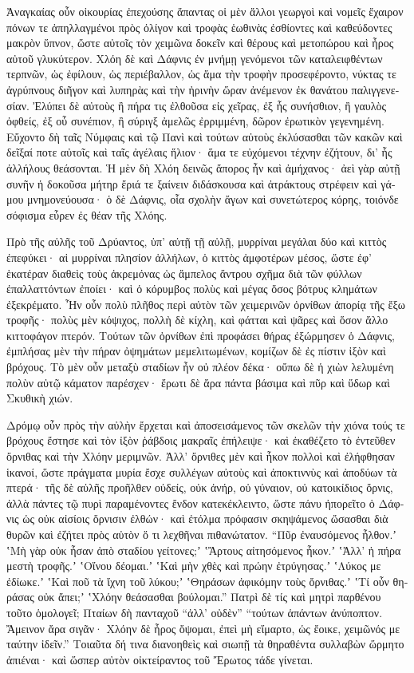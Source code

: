 \documentclass{book}
\begin{document}
\begin{pairs}
\begin{Leftside}
\begin{greek}
  Ἀναγκαίας οὖν οἰκουρίας ἐπεχούσης ἅπαντας οἱ μὲν ἄλλοι γεωργοὶ καὶ νομεῖς ἔχαιρον πόνων τε ἀπηλλαγμένοι πρὸς ὀλίγον καὶ τροφὰς ἑωθινὰς ἐσθίοντες καὶ καθεύδοντες μακρὸν ὕπνον, ὥστε αὐτοῖς τὸν χειμῶνα δοκεῖν καὶ θέρους καὶ μετοπώρου καὶ ἦρος αὐτοῦ γλυκύτερον.  Χλόη δὲ καὶ Δάφνις ἐν μνήμῃ γενόμενοι τῶν καταλειφθέντων τερπνῶν, ὡς ἐφίλουν, ὡς περιέβαλλον, ὡς ἅμα τὴν τροφὴν προσεφέροντο, νύκτας τε ἀγρύπνους διῆγον καὶ λυπηρὰς καὶ τὴν ἠρινὴν ὥραν ἀνέμενον ἐκ θανάτου παλιγγενεσίαν.  Ἐλύπει δὲ αὐτοὺς ἢ πήρα τις ἐλθοῦσα εἰς χεῖρας, ἐξ ἧς συνήσθιον, ἢ γαυλὸς ὀφθείς, ἐξ οὗ συνέπιον, ἢ σύριγξ ἀμελῶς ἐρριμμένη, δῶρον ἐρωτικὸν γεγενημένη.  Εὔχοντο δὴ ταῖς Νύμφαις καὶ τῷ Πανὶ καὶ τούτων αὐτοὺς ἐκλύσασθαι τῶν κακῶν καὶ δεῖξαί ποτε αὐτοῖς καὶ ταῖς ἀγέλαις ἥλιον· ἅμα τε εὐχόμενοι τέχνην ἐζήτουν,  δι’ ἧς ἀλλήλους θεάσονται. Ἡ μὲν δὴ Χλόη δεινῶς ἄπορος ἦν καὶ ἀμήχανος· ἀεὶ γὰρ αὐτῇ συνῆν ἡ δοκοῦσα μήτηρ ἔριά τε ξαίνειν διδάσκουσα καὶ ἀτράκτους στρέφειν καὶ γάμου μνημονεύουσα· ὁ δὲ Δάφνις, οἷα σχολὴν ἄγων καὶ συνετώτερος κόρης, τοιόνδε σόφισμα εὗρεν ἐς θέαν τῆς Χλόης.
\pend


  Πρὸ τῆς αὐλῆς τοῦ Δρύαντος, ὑπ’ αὐτῇ τῇ αὐλῇ, μυρρίναι μεγάλαι δύο καὶ κιττὸς ἐπεφύκει· αἱ μυρρίναι πλησίον ἀλλήλων, ὁ κιττὸς ἀμφοτέρων μέσος, ὥστε ἐφ’ ἑκατέραν διαθεὶς τοὺς ἀκρεμόνας ὡς ἄμπελος ἄντρου σχῆμα διὰ τῶν φύλλων ἐπαλλαττόντων ἐποίει· καὶ ὁ κόρυμβος πολὺς καὶ μέγας ὅσος βότρυς κλημάτων ἐξεκρέματο.  Ἦν οὖν πολὺ πλῆθος περὶ αὐτὸν τῶν χειμερινῶν ὀρνίθων ἀπορίᾳ τῆς ἔξω τροφῆς· πολὺς μὲν κόψιχος, πολλὴ δὲ κίχλη, καὶ φάτται καὶ ψᾶρες καὶ ὅσον ἄλλο κιττοφάγον πτερόν.  Τούτων τῶν ὀρνίθων ἐπὶ προφάσει θήρας ἐξώρμησεν ὁ Δάφνις, ἐμπλήσας μὲν τὴν πήραν ὀψημάτων μεμελιτωμένων, κομίζων δὲ ἐς πίστιν ἰξὸν καὶ βρόχους.  Τὸ μὲν οὖν μεταξὺ σταδίων ἦν οὐ πλέον δέκα· οὔπω δὲ ἡ χιὼν λελυμένη πολὺν αὐτῷ κάματον παρέσχεν· ἔρωτι δὲ ἄρα πάντα βάσιμα καὶ πῦρ καὶ ὕδωρ καὶ Σκυθικὴ χιών.
\pend


  Δρόμῳ οὖν πρὸς τὴν αὐλὴν ἔρχεται καὶ ἀποσεισάμενος τῶν σκελῶν τὴν χιόνα τούς τε βρόχους ἔστησε καὶ τὸν ἰξὸν ῥάβδοις μακραῖς ἐπήλειψε· καὶ ἐκαθέζετο τὸ ἐντεῦθεν ὄρνιθας καὶ τὴν Χλόην μεριμνῶν.  Ἀλλ’ ὄρνιθες μὲν καὶ ἧκον πολλοὶ καὶ ἐλήφθησαν ἱκανοί, ὥστε πράγματα μυρία ἔσχε συλλέγων αὐτοὺς καὶ ἀποκτιννὺς καὶ ἀποδύων τὰ πτερά· τῆς δὲ αὐλῆς προῆλθεν οὐδείς, οὐκ ἀνήρ, οὐ γύναιον, οὐ κατοικίδιος ὄρνις, ἀλλὰ πάντες τῷ πυρὶ παραμένοντες ἔνδον κατεκέκλειντο, ὥστε πάνυ ἠπορεῖτο ὁ Δάφνις ὡς οὐκ αἰσίοις ὄρνισιν ἐλθών· καὶ ἐτόλμα πρόφασιν σκηψάμενος ὤσασθαι διὰ θυρῶν καὶ ἐζήτει πρὸς αὑτὸν ὅ τι λεχθῆναι πιθανώτατον.  “Πῦρ ἐναυσόμενος ἦλθον.ʼ ʽΜὴ γὰρ οὐκ ἦσαν ἀπὸ σταδίου γείτονες;ʼ ʽἌρτους αἰτησόμενος ἧκον.ʼ ʽἈλλ’ ἡ πήρα μεστὴ τροφῆς.ʼ ʽΟἴνου δέομαι.ʼ ʽΚαὶ μὴν χθὲς καὶ πρώην ἐτρύγησας.ʼ ʽΛύκος με ἐδίωκε.ʼ ʽΚαὶ ποῦ τὰ ἴχνη τοῦ λύκου;ʼ ʽΘηράσων ἀφικόμην τοὺς ὄρνιθας.ʼ ʽΤί οὖν  θηράσας οὐκ ἄπει;ʼ ʽΧλόην θεάσασθαι βούλομαι.” Πατρὶ δὲ τίς καὶ μητρὶ παρθένου τοῦτο ὁμολογεῖ; Πταίων δὴ πανταχοῦ “ἀλλ’ οὐδὲν” “τούτων ἁπάντων ἀνύποπτον. Ἄμεινον ἄρα σιγᾶν· Χλόην δὲ ἦρος ὄψομαι, ἐπεὶ μὴ εἵμαρτο, ὡς ἔοικε, χειμῶνός με  ταύτην ἰδεῖν.” Τοιαῦτα δή τινα διανοηθεὶς καὶ σιωπῇ τὰ θηραθέντα συλλαβὼν ὥρμητο ἀπιέναι· καὶ ὥσπερ αὐτὸν οἰκτείραντος τοῦ Ἔρωτος τάδε γίνεται.
\pend



\end{greek}
\end{Leftside}
\end{pairs}
\end{document}
